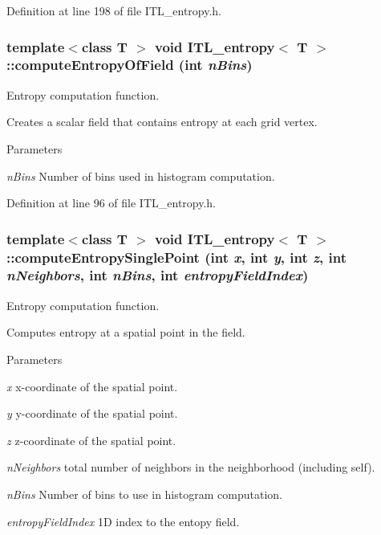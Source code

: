 Definition at line 198 of file ITL\_\-entropy.h.

\hypertarget{classITL__entropy_a4ad3dd3d26770b6e651d936e2914ed2f}{
\subsubsection[{computeEntropyOfField}]{\setlength{\rightskip}{0pt plus 5cm}template$<$class T $>$ void {\bf ITL\_\-entropy}$<$ T $>$::computeEntropyOfField (int {\em nBins})}}
\label{classITL__entropy_a4ad3dd3d26770b6e651d936e2914ed2f}


Entropy computation function. 

Creates a scalar field that contains entropy at each grid vertex. 
\begin{DoxyParams}{Parameters}
\item[{\em nBins}]Number of bins used in histogram computation. \end{DoxyParams}


Definition at line 96 of file ITL\_\-entropy.h.

\hypertarget{classITL__entropy_aedf49a83fa884a6a4c191a0ddba518dd}{
\subsubsection[{computeEntropySinglePoint}]{\setlength{\rightskip}{0pt plus 5cm}template$<$class T $>$ void {\bf ITL\_\-entropy}$<$ T $>$::computeEntropySinglePoint (int {\em x}, \/  int {\em y}, \/  int {\em z}, \/  int {\em nNeighbors}, \/  int {\em nBins}, \/  int {\em entropyFieldIndex})}}
\label{classITL__entropy_aedf49a83fa884a6a4c191a0ddba518dd}


Entropy computation function. 

Computes entropy at a spatial point in the field. 
\begin{DoxyParams}{Parameters}
\item[{\em x}]x-\/coordinate of the spatial point. \item[{\em y}]y-\/coordinate of the spatial point. \item[{\em z}]z-\/coordinate of the spatial point. \item[{\em nNeighbors}]total number of neighbors in the neighborhood (including self). \item[{\em nBins}]Number of bins to use in histogram computation. \item[{\em entropyFieldIndex}]1D index to the entopy field. \end{DoxyParams}


